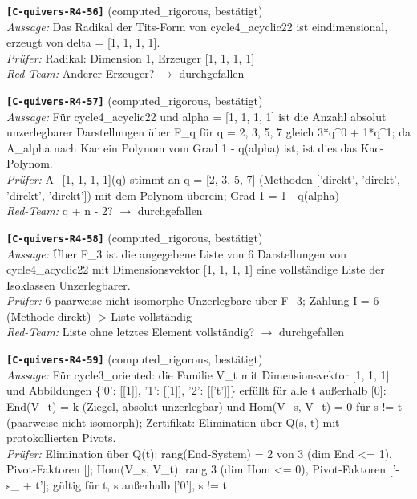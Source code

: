 \documentclass[11pt]{article}
\theoremstyle{definition}\newtheorem{definition}[theorem]{Definition}\newtheorem{remark}[theorem]{Remark}\newtheorem{observation}[theorem]{Numerical observation}
\begin{document}
\noindent\textbf{\texttt{[C-quivers-R4-56]}} (computed\_rigorous, bestätigt)\\
\textit{Aussage:} Das Radikal der Tits-Form von cycle4\_acyclic22 ist eindimensional, erzeugt von delta = [1, 1, 1, 1].\\
\textit{Prüfer:} Radikal: Dimension 1, Erzeuger [1, 1, 1, 1]\\
\textit{Red-Team:} Anderer Erzeuger? $\to$ durchgefallen\par\medskip
\noindent\textbf{\texttt{[C-quivers-R4-57]}} (computed\_rigorous, bestätigt)\\
\textit{Aussage:} Für cycle4\_acyclic22 und alpha = [1, 1, 1, 1] ist die Anzahl absolut unzerlegbarer Darstellungen über F\_q für q = 2, 3, 5, 7 gleich 3*q\textasciicircum{}0 + 1*q\textasciicircum{}1; da A\_alpha nach Kac ein Polynom vom Grad 1 - q(alpha) ist, ist dies das Kac-Polynom.\\
\textit{Prüfer:} A\_[1, 1, 1, 1](q) stimmt an q = [2, 3, 5, 7] (Methoden ['direkt', 'direkt', 'direkt', 'direkt']) mit dem Polynom überein; Grad 1 = 1 - q(alpha)\\
\textit{Red-Team:} q + n - 2? $\to$ durchgefallen\par\medskip
\noindent\textbf{\texttt{[C-quivers-R4-58]}} (computed\_rigorous, bestätigt)\\
\textit{Aussage:} Über F\_3 ist die angegebene Liste von 6 Darstellungen von cycle4\_acyclic22 mit Dimensionsvektor [1, 1, 1, 1] eine vollständige Liste der Isoklassen Unzerlegbarer.\\
\textit{Prüfer:} 6 paarweise nicht isomorphe Unzerlegbare über F\_3; Zählung I = 6 (Methode direkt) -> Liste vollständig\\
\textit{Red-Team:} Liste ohne letztes Element vollständig? $\to$ durchgefallen\par\medskip
\noindent\textbf{\texttt{[C-quivers-R4-59]}} (computed\_rigorous, bestätigt)\\
\textit{Aussage:} Für cycle3\_oriented: die Familie V\_t mit Dimensionsvektor [1, 1, 1] und Abbildungen \{'0': [[1]], '1': [[1]], '2': [['t']]\} erfüllt für alle t außerhalb [0]: End(V\_t) = k (Ziegel, absolut unzerlegbar) und Hom(V\_s, V\_t) = 0 für s != t (paarweise nicht isomorph); Zertifikat: Elimination über Q(s, t) mit protokollierten Pivots.\\
\textit{Prüfer:} Elimination über Q(t): rang(End-System) = 2 von 3 (dim End <= 1), Pivot-Faktoren []; Hom(V\_s, V\_t): rang 3 (dim Hom <= 0), Pivot-Faktoren ['-s\_ + t']; gültig für t, s außerhalb ['0'], s != t\\
\end{document}
